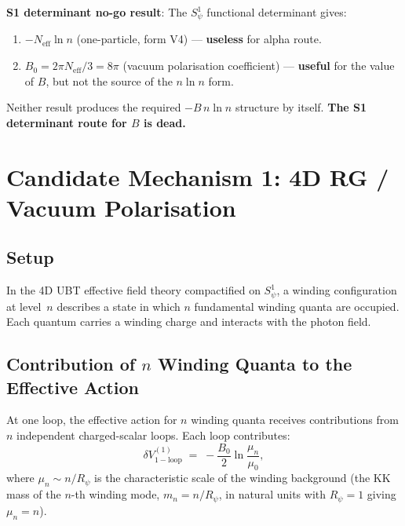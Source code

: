 \documentclass[12pt,a4paper]{article}
\theoremstyle{definition}
\theoremstyle{remark}
\newcommand{\Neff}{N_{\mathrm{eff}}}
\begin{document}
\begin{resultbox}
\textbf{S1 determinant no-go result}: The $S^1_\psi$ functional determinant
gives:
\begin{enumerate}
  \item $-\Neff\ln n$ (one-particle, form V4) — \textbf{useless} for alpha route.
  \item $B_0 = 2\pi\Neff/3 = 8\pi$ (vacuum polarisation coefficient) — \textbf{useful}
        for the value of $B$, but not the source of the $n\ln n$ form.
\end{enumerate}
Neither result produces the required $-B\,n\ln n$ structure by itself.
\textbf{The S1 determinant route for $B$ is dead.}
\end{resultbox}

\section{Candidate Mechanism 1: 4D RG / Vacuum Polarisation}
\label{sec:nlogn:RG}

\subsection{Setup}
\label{ssec:nlogn:RG_setup}

In the 4D UBT effective field theory compactified on $S^1_\psi$, a winding
configuration at level~$n$ describes a state in which $n$ fundamental winding
quanta are occupied.  Each quantum carries a winding charge and interacts with
the photon field.

\subsection{Contribution of $n$ Winding Quanta to the Effective Action}
\label{ssec:nlogn:RG_calculation}

At one loop, the effective action for $n$ winding quanta receives contributions
from $n$ independent charged-scalar loops.  Each loop contributes:
\begin{equation}
  \delta V_{\mathrm{1-loop}}^{(1)} \;=\; -\frac{B_0}{2}\ln\!\frac{\mu_n}{\mu_0},
  \label{eq:nlogn:single_loop}
\end{equation}
where $\mu_n \sim n/R_\psi$ is the characteristic scale of the winding
background (the KK mass of the $n$-th winding mode, $m_n = n/R_\psi$, in
natural units with $R_\psi = 1$ giving $\mu_n = n$).
\end{document}
